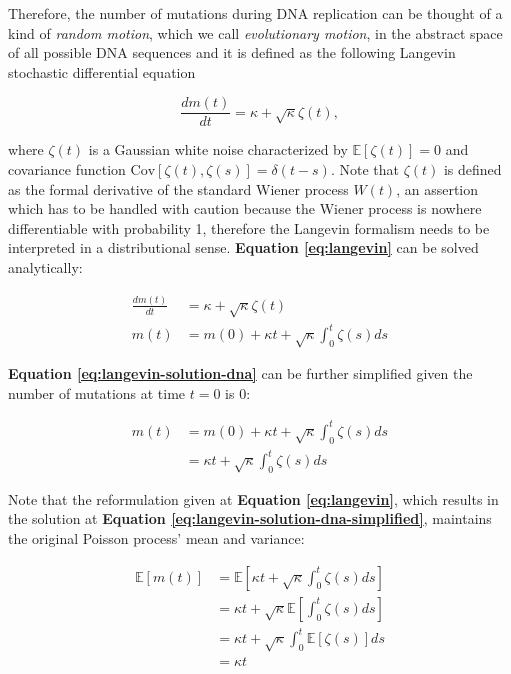 Therefore, the number of mutations during DNA replication can be thought of a kind of \textit{random motion}, which we call \textit{evolutionary motion}, in the abstract space of all possible DNA sequences and it is defined as the following Langevin stochastic differential equation

\begin{equation}
    \frac{dm(t)}{dt} = \kappa + \sqrt{\kappa}\zeta(t)\label{eq:langevin},
\end{equation}

\noindent where $\zeta(t)$ is a Gaussian white noise characterized by $\mathbb{E}\left[\zeta(t)\right]=0$ and covariance function $\text{Cov}\left[\zeta(t),\zeta(s)\right]=\delta (t - s)$. Note that $\zeta(t)$ is defined as the formal derivative of the standard Wiener process $W(t)$, an assertion which has to be handled with caution because the Wiener process is nowhere differentiable with probability 1, therefore the Langevin formalism needs to be interpreted in a distributional sense. \textbf{Equation \ref{eq:langevin}} can be solved analytically:

\begin{align}
    \frac{dm(t)}{dt} &= \kappa + \sqrt{\kappa}\zeta(t)\nonumber\\
    m(t) &= m(0) + \kappa t + \sqrt{\kappa}\int_0^t \zeta(s)ds\label{eq:langevin-solution-dna}
\end{align}

\textbf{Equation \ref{eq:langevin-solution-dna}} can be further simplified given the number of mutations at time $t = 0$ is $0$:

\begin{align}
    m(t) &= m(0) + \kappa t + \sqrt{\kappa}\int_0^t \zeta(s)ds\nonumber\\
    &= \kappa t + \sqrt{\kappa}\int_0^t \zeta(s)ds\label{eq:langevin-solution-dna-simplified}
\end{align}

Note that the reformulation given at \textbf{Equation \ref{eq:langevin}}, which results in the solution at \textbf{Equation \ref{eq:langevin-solution-dna-simplified}}, maintains the original Poisson process' mean and variance:

\begin{align}
    \mathbb{E}\left[m(t)\right] &= \mathbb{E}\left[\kappa t + \sqrt{\kappa}\int_0^t \zeta(s)ds\right]\\
    &= \kappa t + \sqrt{\kappa}\mathbb{E}\left[\int_0^t\zeta(s)ds\right]\label{eq:langevin-mean-step1}\\
    &= \kappa t + \sqrt{\kappa}\int_0^t\mathbb{E}\left[\zeta(s)\right]ds\label{eq:langevin-mean-step2}\\
    &= \kappa t\label{eq:langevin-mean}
\end{align}

